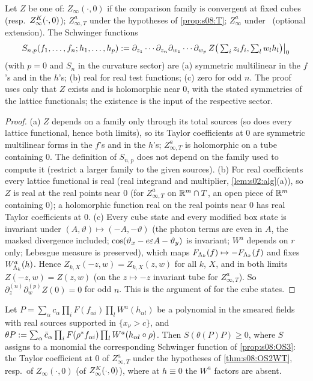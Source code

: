 \begin{proposition}\label{prop:s08:OS3}
Let $Z$ be one of: $Z_\infty(\cdot,0)$ if the comparison family is convergent at fixed cubes (resp.\ $Z^{K}_{\infty}(\cdot,0)$); $Z^a_{\infty,T}$ under the hypotheses of \cref{prop:s08:T}; $Z^a_\infty$ under \Wtwo\ (optional extension). The Schwinger functions
\[
S_{n,p}(f_1,\dots,f_n;h_1,\dots,h_p):=\partial_{z_1}\cdots\partial_{z_n}\partial_{w_1}\cdots\partial_{w_p}\,Z\big(\textstyle\sum_iz_if_i,\sum_lw_lh_l\big)\big|_{0}
\]
(with $p=0$ and $S_n$ in the curvature sector) are (a) symmetric multilinear in the $f$'s and in the $h$'s; (b) real for real test functions; (c) zero for odd $n$. The proof uses only that $Z$ exists and is holomorphic near $0$, with the stated symmetries of the lattice functionals; the existence is the input of the respective sector.
\end{proposition}

\begin{proof}
(a) $Z$ depends on a family only through its total sources (so does every lattice functional, hence both limits), so its Taylor coefficients at $0$ are symmetric multilinear forms in the $f$'s and in the $h$'s; $Z^a_{\infty,T}$ is holomorphic on a tube containing $0$. The definition of $S_{n,p}$ does not depend on the family used to compute it (restrict a larger family to the given sources). (b) For real coefficients every lattice functional is real (real integrand and multiplier, \cref{lem:s02:alg}(a)), so $Z$ is real at the real points near $0$ (for $Z^a_{\infty,T}$ on $\mathbb R^m\cap T$, an open piece of $\mathbb R^m$ containing $0$); a holomorphic function real on the real points near $0$ has real Taylor coefficients at $0$. (c) Every cube state and every modified box state is invariant under $(A,\vartheta)\mapsto(-A,-\vartheta)$ (the photon terms are even in $A$, the masked divergence included; $\cos(\vartheta_x-e\varepsilon A-\vartheta_y)$ is invariant; $W^a$ depends on $r$ only; Lebesgue measure is preserved), which maps $F_{\Lambda_k}(f)\mapsto-F_{\Lambda_k}(f)$ and fixes $W^a_{\Lambda_k}(h)$. Hence $Z_{k,X}(-z,w)=Z_{k,X}(z,w)$ for all $k$, $X$, and in both limits $Z(-z,w)=Z(z,w)$ (on the $z\mapsto-z$ invariant tube for $Z^a_{\infty,T}$). So $\partial_z^{(n)}\partial_w^{(p)}Z(0)=0$ for odd $n$. This is the argument of \cite[Lemma~9.7, Thm.~9.8]{SymPhase} for the cube states.
\end{proof}

\begin{proposition}\label{prop:s08:poly}
Let $P=\sum_\alpha c_\alpha\prod_iF(f_{\alpha i})\prod_lW^a(h_{\alpha l})$ be a polynomial in the smeared fields with real sources supported in $\{x_\nu>c\}$, and $\theta P:=\sum_\alpha\bar c_\alpha\prod_iF(\rho^*f_{\alpha i})\prod_lW^a(h_{\alpha l}\circ\rho)$. Then $S(\theta(P)P)\ge0$, where $S$ assigns to a monomial the corresponding Schwinger function of \cref{prop:s08:OS3}: the Taylor coefficient at $0$ of $Z^a_{\infty,T}$ under the hypotheses of \cref{thm:s08:OS2WT}, resp.\ of $Z_\infty(\cdot,0)$ (of $Z^{K}_{\infty}(\cdot,0)$), where at $h\equiv0$ the $W^a$ factors are absent.
\end{proposition}

